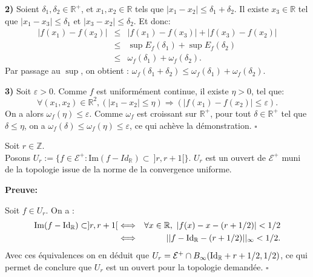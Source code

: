 	\par \textbf{2)} Soient $\delta_1,\delta_2 \in \mathbb{R}^+$, et $x_1, x_2 \in \mathbb{R}$ tels que $|x_1 -x_2|\leq \delta_1 + \delta_2$. Il existe $x_3 \in \mathbb{R}$ tel que $|x_1 -x_3|\leq \delta_1$ et $|x_3 -x_2|\leq \delta_2$. Et donc:
	\begin{eqnarray*}
		|f(x_1)-f(x_2)|&\leq& |f(x_1)-f(x_3)| + |f(x_3)-f(x_2)|\\
			&\leq& \sup E_f(\delta_1) + \sup E_f(\delta_2)\\
			&\leq& \omega_f(\delta_1) + \omega_f(\delta_2).
	\end{eqnarray*}
	Par passage au $\sup$, on obtient : $\omega_f(\delta_1 + \delta_2) \leq \omega_f(\delta_1) +\omega_f(\delta_2)$.\\

	\par \textbf{3)} Soit $\varepsilon > 0$. Comme $f$ est uniformément continue, il existe $\eta >0$, tel que:
	$$\forall (x_1,x_2) \in \mathbb{R}^2, ( |x_1-x_2|\leq \eta) \Longrightarrow (|f(x_1)-f(x_2)|\leq \varepsilon).  $$
	On a alors $\omega_f(\eta)\leq\varepsilon$. Comme $\omega_f$ est croissant sur $\mathbb{R}^+$, pour tout $\delta \in \mathbb{R}^+$ tel que $\delta \leq \eta$, on a $\omega_f(\delta)\leq\omega_f(\eta)\leq\varepsilon$, ce qui achève la démonstration. \hfill $\square$\\














\begin{lemma}\label{ouvertUr}
	Soit $r \in \mathbb{Z}$.\\
	Posons $U_r:=\lbrace f \in \mathcal{E}^+: \mathrm{Im}(f-Id_{\mathbb{R}}) \subset\ ]r,r+1[\rbrace$. $U_r$ est un ouvert de $\mathcal{E}^+$ muni de la topologie issue de la norme de la convergence uniforme.
\end{lemma}

\textbf{Preuve:}
	\par Soit $f\in U_r$. On a :
	\begin{eqnarray*}
		\mathrm{Im}(f - \mathrm{Id}_{{\mathbb{R}}}) \subset ]r,r+1[ &\Longleftrightarrow& \forall x \in {\mathbb{R}},\ |f(x)-x-(r+1/2)|< 1/2\\
		&\Longleftrightarrow& ||f - \mathrm{Id}_{\mathbb{R}} - (r + 1/2) ||_{\infty} < 1/2.
	\end{eqnarray*}
	Avec ces équivalences on en déduit que $U_r = {\mathcal{E}}^+ \cap  B_{\infty}(\mathrm{Id}_{\mathbb{R}}+r + 1/2,1/2)$, ce qui permet de conclure que $U_r$ est un ouvert pour la topologie demandée.
	 \hfill $\square$\\







